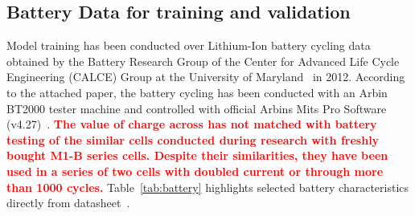 \subsection{Battery Data for training and validation} \label{subsec:b_data}
%
Model training has been conducted over Lithium-Ion battery cycling data obtained by the Battery Research Group of the Center for Advanced Life Cycle Engineering (CALCE) Group at the University of Maryland~\cite{noauthor_calce_2017} in 2012.
According to the attached paper, the battery cycling has been conducted with an Arbin BT2000 tester machine and controlled with official Arbins Mits Pro Software (v4.27)~\cite{xing_state_2014}.
\textcolor{red}{\textbf{The value of charge across has not matched with battery testing of the similar cells conducted during research with freshly bought M1-B series cells.
Despite their similarities, they have been used in a series of two cells with doubled current or through more than 1000 cycles.}}
\mbox{Table~\ref{tab:battery}} highlights selected battery characteristics directly from datasheet~\cite{noauthor_anr26650m1a}.
\begin{table}[ht]
    \renewcommand{\arraystretch}{1.3}
    \caption{Battery characteristics}
    \centering
    \label{tab:battery}
\end{table}

